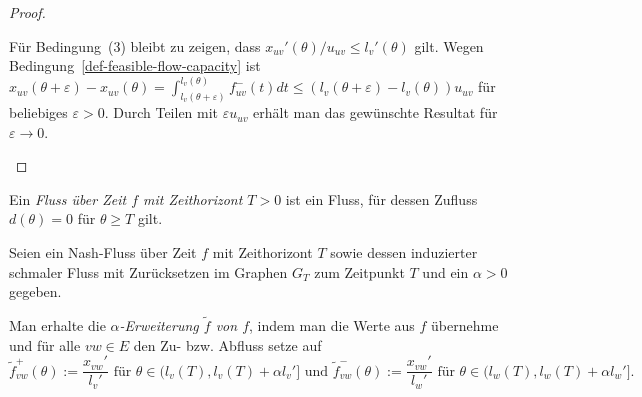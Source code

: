\begin{proof}
\begin{description}[leftmargin=0cm, topsep=0cm, itemindent=\parindent]
		Für Bedingung~(3) bleibt zu zeigen, dass $x_{uv}'(\theta) /u_{uv}\leq l_v'(\theta)$ gilt.
		Wegen Bedingung~\ref{def-feasible-flow-capacity} ist $x_{uv}(\theta + \varepsilon)-x_{uv}(\theta) = \int_{l_v(\theta+\varepsilon)}^{l_v(\theta)} f_{uv}^-(t) dt\leq (l_v(\theta + \varepsilon) - l_v(\theta)) u_{uv}$ für beliebiges $\varepsilon>0$.
		Durch Teilen mit $\varepsilon u_{uv}$ erhält man das gewünschte Resultat für $\varepsilon\rightarrow 0$.
	\end{description}
\vspace{-1.2 \baselineskip}\end{proof}

\begin{definition}
	Ein \emph{Fluss über Zeit $f$ mit Zeithorizont $T>0$} ist ein Fluss, für dessen Zufluss $d(\theta)= 0$ für $\theta\geq T$ gilt.
\end{definition}

\begin{definition}
	Seien ein Nash-Fluss über Zeit $f$ mit Zeithorizont $T$ sowie dessen induzierter schmaler Fluss mit Zurücksetzen im Graphen $G_T$ zum Zeitpunkt $T$ und ein $\alpha > 0$ gegeben.
	
	
	Man erhalte die \emph{$\alpha$-Erweiterung $\tilde{f}$ von $f$}, indem man die Werte aus $f$ übernehme und für alle $vw\in E$ den Zu- bzw. Abfluss setze auf
	$$\tilde{f}_{vw}^+(\theta):= \frac{x_{vw}'}{l_v'} \text{ für $\theta\in (l_v(T), l_v(T)+\alpha l_v']$ und } \tilde{f}_{vw}^-(\theta):=\frac{x_{vw}'}{l_w'} \text{ für $\theta\in (l_w(T), l_w(T)+\alpha l_w']$.}$$
\end{definition}

